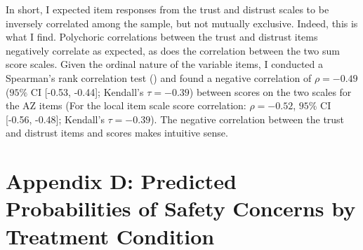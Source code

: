 \documentclass[
  12pt,
  letterpaper,
]{article}
\begin{document}
In short, I expected item responses from the trust and distrust scales
to be inversely correlated among the sample, but not mutually exclusive.
Indeed, this is what I find. Polychoric correlations between the trust
and distrust items negatively correlate as expected, as does the
correlation between the two sum score scales. Given the ordinal nature
of the variable items, I conducted a Spearman's rank correlation test
() and found a negative
correlation of \(\rho = -0.49\) (\(95\%\) CI {[}-0.53, -0.44{]};
Kendall's \(\tau = -0.39\)) between scores on the two scales for the AZ
items (For the local item scale score correlation: \(\rho = -0.52\),
\(95\%\) CI {[}-0.56, -0.48{]}; Kendall's \(\tau = -0.39\)). The
negative correlation between the trust and distrust items and scores
makes intuitive sense.

\newpage{}

\section{Appendix D: Predicted Probabilities of Safety Concerns by
Treatment
Condition}\label{appendix-d-predicted-probabilities-of-safety-concerns-by-treatment-condition}
\end{document}
